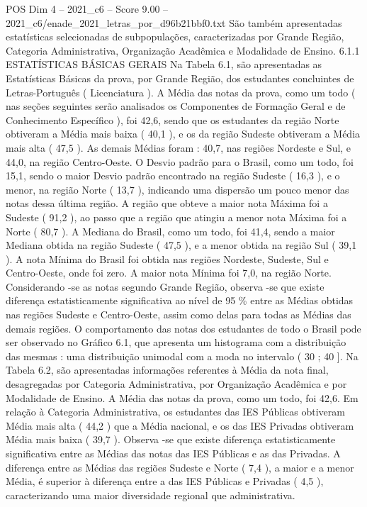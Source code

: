 \begin{textsample}{POS Dim 4 – 2021\_c6 – Score 9.00 – 2021\_c6/enade\_2021\_letras\_por\_d96b21bbf0.txt}
São também apresentadas estatísticas selecionadas de subpopulações, caracterizadas por Grande Região, Categoria Administrativa, Organização Acadêmica e Modalidade de Ensino. 6.1.1 ESTATÍSTICAS BÁSICAS GERAIS Na Tabela 6.1, são apresentadas as Estatísticas Básicas da prova, por Grande Região, dos estudantes concluintes de Letras-Português ( Licenciatura ).
A Média das notas da prova, como um todo ( nas seções seguintes serão analisados os Componentes de Formação Geral e de Conhecimento Específico ), foi 42,6, sendo que os estudantes da região Norte obtiveram a Média mais baixa ( 40,1 ), e os da região Sudeste obtiveram a Média mais alta ( 47,5 ).
As demais Médias foram : 40,7, nas regiões Nordeste e Sul, e 44,0, na região Centro-Oeste.
O Desvio padrão para o Brasil, como um todo, foi 15,1, sendo o maior Desvio padrão encontrado na região Sudeste ( 16,3 ), e o menor, na região Norte ( 13,7 ), indicando uma dispersão um pouco menor das notas dessa última região.
A região que obteve a maior nota Máxima foi a Sudeste ( 91,2 ), ao passo que a região que atingiu a menor nota Máxima foi a Norte ( 80,7 ).
A Mediana do Brasil, como um todo, foi 41,4, sendo a maior Mediana obtida na região Sudeste ( 47,5 ), e a menor obtida na região Sul ( 39,1 ).
A nota Mínima do Brasil foi obtida nas regiões Nordeste, Sudeste, Sul e Centro-Oeste, onde foi zero.
A maior nota Mínima foi 7,0, na região Norte.
Considerando -se as notas segundo Grande Região, observa -se que existe diferença estatisticamente significativa ao nível de 95 \% entre as Médias obtidas nas regiões Sudeste e Centro-Oeste, assim como delas para todas as Médias das demais regiões.
O comportamento das notas dos estudantes de todo o Brasil pode ser observado no Gráfico 6.1, que apresenta um histograma com a distribuição das mesmas : uma distribuição unimodal com a moda no intervalo ( 30 ; 40 ].
Na Tabela 6.2, são apresentadas informações referentes à Média da nota final, desagregadas por Categoria Administrativa, por Organização Acadêmica e por Modalidade de Ensino.
A Média das notas da prova, como um todo, foi 42,6.
Em relação à Categoria Administrativa, os estudantes das IES Públicas obtiveram Média mais alta ( 44,2 ) que a Média nacional, e os das IES Privadas obtiveram Média mais baixa ( 39,7 ).
Observa -se que existe diferença estatisticamente significativa entre as Médias das notas das IES Públicas e as das Privadas.
A diferença entre as Médias das regiões Sudeste e Norte ( 7,4 ), a maior e a menor Média, é superior à diferença entre a das IES Públicas e Privadas ( 4,5 ), caracterizando uma maior diversidade regional que administrativa.

\end{textsample}
